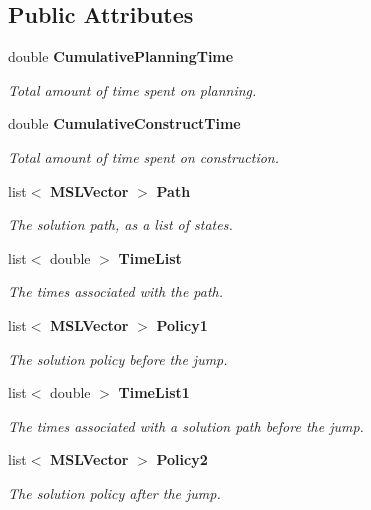 \subsection*{Public Attributes}
\begin{CompactItemize}
\item 
double {\bf Cumulative\-Planning\-Time}
\begin{CompactList}\small\item\em Total amount of time spent on planning.\item\end{CompactList}\item 
double {\bf Cumulative\-Construct\-Time}
\begin{CompactList}\small\item\em Total amount of time spent on construction.\item\end{CompactList}\item 
list$<$ {\bf MSLVector} $>$ {\bf Path}
\begin{CompactList}\small\item\em The solution path, as a list of states.\item\end{CompactList}\item 
list$<$ double $>$ {\bf Time\-List}
\begin{CompactList}\small\item\em The times associated with the path.\item\end{CompactList}\item 
list$<$ {\bf MSLVector} $>$ {\bf Policy1}
\begin{CompactList}\small\item\em The solution policy before the jump.\item\end{CompactList}\item 
list$<$ double $>$ {\bf Time\-List1}
\begin{CompactList}\small\item\em The times associated with a solution path before the jump.\item\end{CompactList}\item 
list$<$ {\bf MSLVector} $>$ {\bf Policy2}
\begin{CompactList}\small\item\em The solution policy after the jump.\item\end{CompactList}\item 

\end{CompactItemize}
